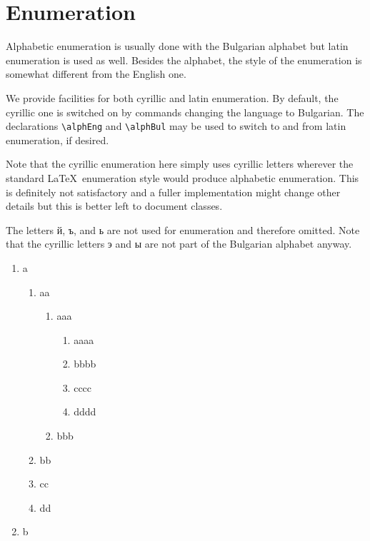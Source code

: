 \documentclass[12pt,a4paper,twosided]{article}
\begin{document}
\section{Enumeration} \label{sec:enum}



Alphabetic enumeration is usually done with the Bulgarian alphabet but latin enumeration is
used as well.  Besides the alphabet, the style of the enumeration is somewhat different from
the English one.

We provide facilities for both cyrillic and latin enumeration. By default, the cyrillic one
is switched on by commands changing the language to Bulgarian. The declarations
\verb+\alphEng+ and \verb+\alphBul+ may be used to switch to and from latin enumeration, if
desired.

Note that the cyrillic enumeration here simply uses cyrillic letters wherever the standard
\LaTeX\ enumeration style would produce alphabetic enumeration.  This is definitely not
satisfactory and a fuller implementation might change other details but this is better left
to document classes.


The letters й, ъ, and ь are not used for enumeration and therefore omitted. Note that the
cyrillic letters э and ы are not part of the Bulgarian alphabet anyway.

\begin{enumerate}   \label{enum:1}
	\item a

	\begin{enumerate}
		\item aa
		\begin{enumerate}
			\item aaa
			\begin{enumerate}
				\item aaaa
	
				\item bbbb

				\item cccc

				\item dddd

			\end{enumerate}
	
			\item bbb

		\end{enumerate}

		\item bb

		\item cc

		\item dd

	\end{enumerate}

	\item b

\end{enumerate}
\end{document}
